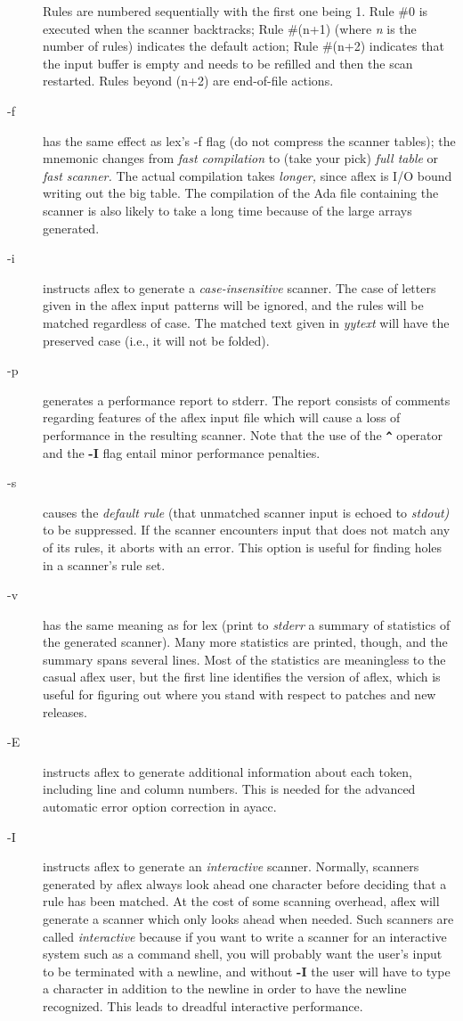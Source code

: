 \begin{description}
\begin{verbatim}
\end{verbatim}
Rules are numbered sequentially with the first one being 1.  Rule \#0
is executed when the scanner backtracks; Rule \#(n+1) (where
{\it n}
is the number of rules) indicates the default action; Rule \#(n+2) indicates
that the input buffer is empty and needs to be refilled and then the scan
restarted.  Rules beyond (n+2) are end-of-file actions.
\item[-f]
has the same effect as lex's -f flag (do not compress the scanner
tables); the mnemonic changes from
{\it fast compilation}
to (take your pick)
{\it full table}
or
{\it fast scanner.}
The actual compilation takes
{\it longer,}
since aflex is I/O bound writing out the big table.
The compilation of the Ada file containing the scanner is also likely
to take a long time because of the large arrays generated.
\item[-i]
instructs aflex to generate a
{\it case-insensitive}
scanner.  The case of letters given in the aflex input patterns will
be ignored, and the rules will be matched regardless of case.  The
matched text given in
{\it yytext}
will have the preserved case (i.e., it will not be folded).
\item[-p]
generates a performance report to stderr.  The report
consists of comments regarding features of the aflex input file
which will cause a loss of performance in the resulting scanner.
Note that the use of
the
{\bf \verb|^|}
operator
and the
{\bf -I}
flag entail minor performance penalties.
\item[-s]
causes the
{\it default rule}
(that unmatched scanner input is echoed to
{\it stdout)}
to be suppressed.  If the scanner encounters input that does not
match any of its rules, it aborts with an error.  This option is
useful for finding holes in a scanner's rule set.
\item[-v]
has the same meaning as for lex (print to
{\it stderr}
a summary of statistics of the generated scanner).  Many more statistics
are printed, though, and the summary spans several lines.  Most
of the statistics are meaningless to the casual aflex user, but the
first line identifies the version of aflex, which is useful for figuring
out where you stand with respect to patches and new releases.
\item[-E]
instructs aflex to generate additional information about each token,
including line and column numbers.  This is needed for the advanced
automatic error option correction in ayacc.
\item[-I]
instructs aflex to generate an
{\it interactive}
scanner.  Normally, scanners generated by aflex always look ahead one
character before deciding that a rule has been matched.  At the cost of
some scanning overhead, aflex will generate a scanner which only looks ahead
when needed.  Such scanners are called
{\it interactive}
because if you want to write a scanner for an interactive system such as a
command shell, you will probably want the user's input to be terminated
with a newline, and without
{\bf -I}
the user will have to type a character in addition to the newline in order
to have the newline recognized.  This leads to dreadful interactive
performance.


\end{description}
